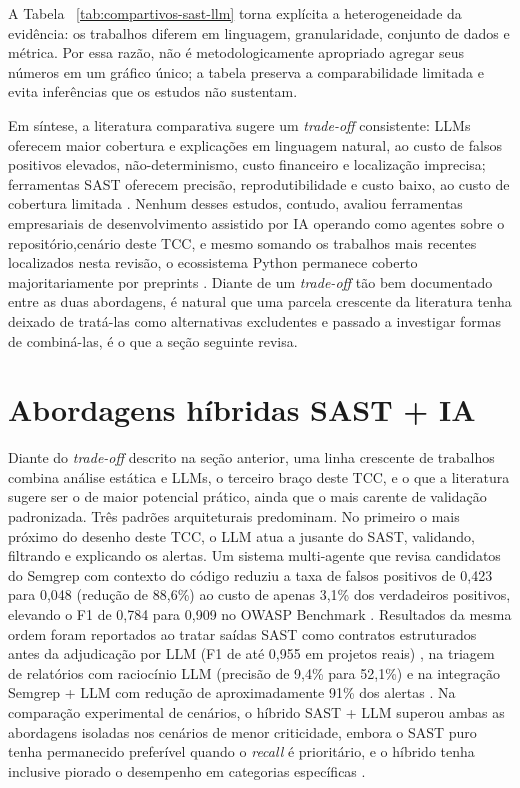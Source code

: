 A Tabela ~\ref{tab:compartivos-sast-llm} torna explícita a heterogeneidade da evidência: os trabalhos diferem em linguagem, granularidade, conjunto de dados e métrica. Por essa razão, não é metodologicamente apropriado agregar seus números em um gráfico único; a tabela preserva a comparabilidade limitada e evita inferências que os estudos não sustentam.

Em síntese, a literatura comparativa sugere um \textit{trade-off} consistente: LLMs oferecem maior cobertura e explicações em linguagem natural, ao custo de falsos positivos elevados, não-determinismo, custo financeiro e localização imprecisa; ferramentas SAST oferecem precisão, reprodutibilidade e custo baixo, ao custo de cobertura limitada \cite{Ozturk2023AIvsSAST, Tamberg2025LLMHarness, Gnieciak2025LLMvsSAST}. Nenhum desses estudos, contudo, avaliou ferramentas empresariais de desenvolvimento assistido por IA operando como agentes sobre o repositório,cenário deste TCC, e mesmo somando os trabalhos mais recentes localizados nesta revisão, o ecossistema Python permanece coberto majoritariamente por preprints \cite{Pellew2026RealVuln, Farasat2025PythonSecurity, Zhou2024SASTLLMRepo, Adnan2026ALPHA}. Diante de um \textit{trade-off} tão bem documentado entre as duas abordagens, é natural que uma parcela crescente da literatura tenha deixado de tratá-las como alternativas excludentes e passado a investigar formas de combiná-las, é o que a seção seguinte revisa.




\section{Abordagens híbridas SAST + IA}\label{sec:abordagens-hibridas}
Diante do \textit{trade-off} descrito na seção anterior, uma linha crescente de trabalhos combina análise estática e LLMs, o terceiro braço deste TCC, e o que a literatura sugere ser o de maior potencial prático, ainda que o mais carente de validação padronizada. Três padrões arquiteturais predominam. No primeiro o mais próximo do desenho deste TCC, o LLM atua a jusante do SAST, validando, filtrando e explicando os alertas. Um sistema multi-agente que revisa candidatos do Semgrep com contexto do código reduziu a taxa de falsos positivos de 0,423 para 0,048 (redução de 88,6\%) ao custo de apenas 3,1\% dos verdadeiros positivos, elevando o F1 de 0,784 para 0,909 no OWASP Benchmark \cite{Ameen2026QASecClaw}. Resultados da mesma ordem foram reportados ao tratar saídas SAST como contratos estruturados antes da adjudicação por LLM (F1 de até 0,955 em projetos reais) \cite{Iranmanesh2025ZeroFalse}, na triagem de relatórios com raciocínio LLM (precisão de 9,4\% para 52,1\%) \cite{Li2025SASTReportsLLM} e na integração Semgrep + LLM com redução de aproximadamente 91\% dos alertas \cite{Agrawal2025SASTGenius}. Na comparação experimental de cenários, o híbrido SAST + LLM superou ambas as abordagens isoladas nos cenários de menor criticidade, embora o SAST puro tenha permanecido preferível quando o \textit{recall} é prioritário, e o híbrido tenha inclusive piorado o desempenho em categorias específicas \cite{Ciavatta2026LLMSAST}.

